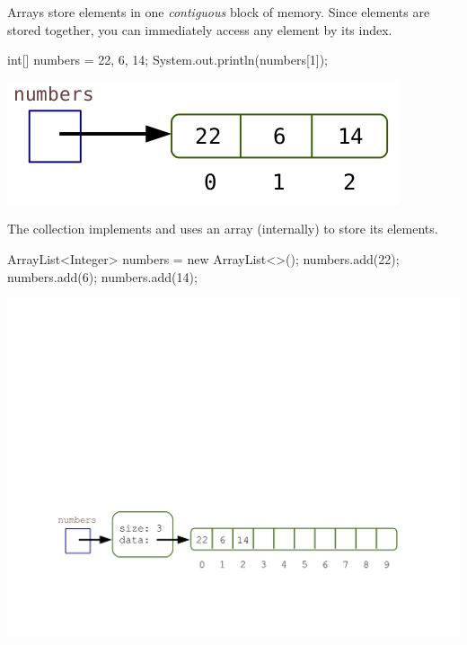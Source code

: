 
Arrays store elements in one \textit{contiguous} block of memory.
Since elements are stored together, you can immediately access any element by its index.

\vspace{1ex}
\begin{minipage}{0.50\linewidth}
\begin{javalst}
    int[] numbers = {22, 6, 14};
    System.out.println(numbers[1]);
\end{javalst}
\end{minipage}
\hfill
\begin{minipage}{0.48\linewidth}
\centering
\includegraphics[scale=0.35]{figs/array1.png}
\end{minipage}
\vspace{1ex}

The  collection implements  and uses an array (internally) to store its elements.

\vspace{1ex}
\begin{minipage}{0.35\linewidth}
\begin{javalst}
    ArrayList<Integer> numbers = new ArrayList<>();
    numbers.add(22);
    numbers.add(6);
    numbers.add(14);
\end{javalst}
\end{minipage}
\hfill
\begin{minipage}{0.63\linewidth}
\vspace*{2em}
\includegraphics[scale=0.45]{figs/array2.pdf}
\end{minipage}
\vspace{1ex}

